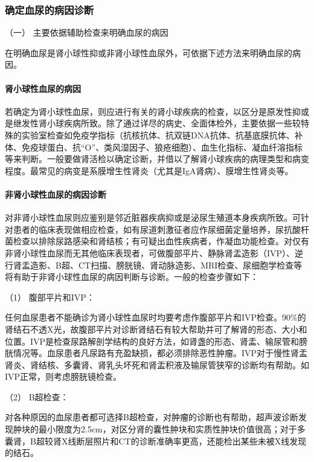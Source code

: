 \subsubsection{确定血尿的病因诊断}

\hypertarget{text00037.htmlux5cux23CHP1-15-2-4-1}{}
（一） 主要依据辅助检查来明确血尿的病因

在明确血尿是肾小球性抑或非肾小球性血尿外，可依据下述方法来明确血尿的病因。

\paragraph{肾小球性血尿的病因}

若确定为肾小球性血尿，则应进行有关的肾小球疾病的检查，以区分是原发性抑或是继发性肾小球疾病所致。除了通过详尽的病史、全面体检外，主要依据一些较特殊的实验室检查如免疫学指标（抗核抗体、抗双链DNA抗体、抗基底膜抗体、补体、免疫球蛋白、抗“O”、类风湿因子、狼疮细胞）、血生化指标、凝血纤溶指标等来判断。一般要做肾活检以确定诊断，并借以了解肾小球疾病的病理类型和病变程度。最常见的病变是系膜增生性肾炎（尤其是IgA肾病）、膜增生性肾炎等。

\paragraph{非肾小球性血尿的病因诊断}

对非肾小球性血尿则应鉴别是邻近脏器疾病抑或是泌尿生殖道本身疾病所致。可针对患者的临床表现做相应检查，如有尿道刺激征者应作尿细菌定量培养，尿抗酸杆菌检查以排除尿路感染和肾结核；有可疑出血性疾病者，作凝血功能检查。对仅有非肾小球性血尿而无其他临床表现者，可做腹部平片、静脉肾盂造影（IVP）、逆行肾盂造影、B超、CT扫描、膀胱镜、肾动脉造影、MRI检查、尿细胞学检查等将有助于非肾小球性血尿的病因判断与诊断。一般的检查步骤如下：

\hypertarget{text00037.htmlux5cux23CHP1-15-2-4-1-2-1}{}
（1） 腹部平片和IVP：

任何血尿患者不能确诊为肾小球性血尿时均要考虑作腹部平片和IVP检查。90\%的肾结石不透X光，故腹部平片对诊断肾结石有较大帮助并可了解肾的形态、大小和位置。IVP是检查尿路解剖学结构的良好方法，如肾盏的形态、肾盂、输尿管和膀胱情况等。血尿患者凡尿路有充盈缺损，都必须排除恶性肿瘤。IVP对于慢性肾盂肾炎、肾结核、多囊肾、肾乳头坏死和肾盂积液及输尿管狭窄的诊断均有帮助。如IVP正常，则考虑膀胱镜检查。

\hypertarget{text00037.htmlux5cux23CHP1-15-2-4-1-2-2}{}
（2） B超检查：

对各种原因的血尿患者都可选择B超检查，对肿瘤的诊断也有帮助，超声波诊断发现肿块的最小限度为2.5cm，对区分肾的囊性肿块和实质性肿块价值很高；对于多囊肾，B超较肾X线断层照片和CT的诊断准确率更高，还能检出某些未被X线发现的结石。

